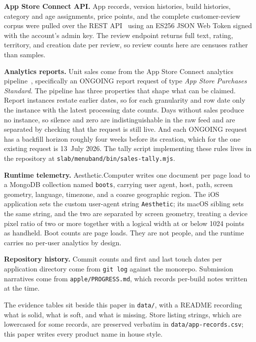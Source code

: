 \documentclass[10pt,letterpaper,twocolumn]{article}
\newcommand{\acdot}{{\color{acpink}.}}
\newcommand{\ac}{Aesthetic{\acdot}Computer}
\begin{document}
\textbf{App Store Connect API.} App records, version histories, build
histories, category and age assignments, price points, and the complete
customer-review corpus were pulled over the REST
API~\citep{apple2026ascapi} using an ES256 JSON Web Token signed with the
account's admin key. The review endpoint returns full text, rating,
territory, and creation date per review, so review counts here are
censuses rather than samples.

\textbf{Analytics reports.} Unit sales come from the App Store Connect
analytics pipeline~\citep{apple2026analytics}, specifically an ONGOING
report request of type \emph{App Store Purchases Standard}. The pipeline
has three properties that shape what can be claimed. Report instances
restate earlier dates, so for each granularity and row date only the
instance with the latest processing date counts. Days without sales
produce no instance, so silence and zero are indistinguishable in the
raw feed and are separated by checking that the request is still
live. And each ONGOING request has a backfill horizon roughly four weeks
before its creation, which for the one existing request is 13~July 2026.
The tally script implementing these rules lives in the repository at
\texttt{slab/menuband/bin/sales-tally.mjs}.

\textbf{Runtime telemetry.} \ac{} writes one document per page load to a
MongoDB collection named \texttt{boots}, carrying user agent, host, path,
screen geometry, language, timezone, and a coarse geographic region. The
iOS application sets the custom user-agent string \texttt{Aesthetic}; its
macOS sibling sets the same string, and the two are separated by screen
geometry, treating a device pixel ratio of two or more together with a
logical width at or below 1024 points as handheld. Boot counts are page
loads. They are not people, and the runtime carries no per-user analytics
by design.

\textbf{Repository history.} Commit counts and first and last touch dates
per application directory come from \texttt{git log} against the
monorepo. Submission narratives come from \texttt{apple/PROGRESS.md},
which records per-build notes written at the time.

The evidence tables sit beside this paper in \texttt{data/}, with a
README recording what is solid, what is soft, and what is missing. Store
listing strings, which are lowercased for some records, are preserved
verbatim in \texttt{data/app-records.csv}; this paper writes every
product name in house style.
\end{document}
